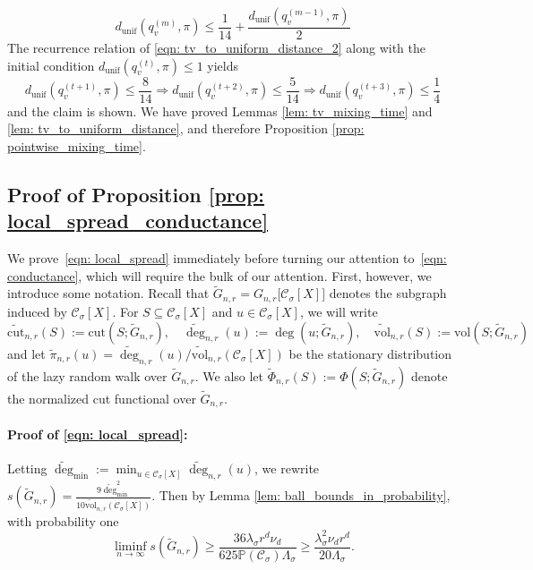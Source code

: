 \documentclass[11pt,twoside]{article}
\newcommand{\vol}{\mathrm{vol}}
\newcommand{\cut}{\mathrm{cut}}
\newcommand{\1}{\mathbf{1}}
\newcommand{\Xbf}{X}             %
\newcommand{\Pbb}{\mathbb{P}}
\newcommand{\Cset}{\mathcal{C}}
\newcommand{\Csig}{\Cset_{\sigma}}
\newcommand{\degminwt}{\widetilde{\deg}_{\min}}
\begin{document}
\begin{equation}
d_{\textrm{unif}}(q_v^{(m)}, \pi) \leq \frac{1}{14} + \frac{d_{\textrm{unif}}(q_v^{(m - 1)}, \pi)}{2} \label{eqn: tv_to_uniform_distance_2}
\end{equation}
The recurrence relation of \eqref{eqn: tv_to_uniform_distance_2} along with the initial condition $d_{\textrm{unif}}(q_v^{(t)}, \pi) \leq 1$ yields
\begin{equation*}
d_{\textrm{unif}}(q_v^{(t + 1)}, \pi) \leq \frac{8}{14} \Rightarrow d_{\textrm{unif}}(q_v^{(t + 2)}, \pi) \leq \frac{5}{14} \Rightarrow  d_{\textrm{unif}}(q_v^{(t + 3)}, \pi) \leq \frac{1}{4}
\end{equation*}
and the claim is shown. We have proved Lemmas \ref{lem: tv_mixing_time} and \ref{lem: tv_to_uniform_distance}, and therefore Proposition \ref{prop: pointwise_mixing_time}.

\subsection{Proof of Proposition \ref{prop: local_spread_conductance}}

We prove~\eqref{eqn: local_spread} immediately before turning our attention to~\eqref{eqn: conductance}, which will require the bulk of our attention. First, however, we introduce some notation. Recall that $\widetilde{G}_{n,r} = G_{n,r}\bigl[\Csig[\Xbf]\bigr]$ denotes the subgraph induced by $\Csig[\Xbf]$. For $S \subseteq \Csig[\Xbf]$ and $u \in \Csig[\Xbf]$, we will write
\begin{equation*}
\widetilde{\cut}_{n,r}(S) := \cut(S; \widetilde{G}_{n,r}), \quad \widetilde{\deg}_{n,r}(u) := \deg(u; \widetilde{G}_{n,r}), \quad 
\widetilde{\vol}_{n,r}(S) := \vol(S; \widetilde{G}_{n,r})
\end{equation*}
and let $\widetilde{\pi}_{n,r}(u) = \widetilde{\deg}_{n,r}(u)/\widetilde{\vol}_{n,r}(\Csig[\Xbf])$ be the stationary distribution of the lazy random walk over $\widetilde{G}_{n,r}$. We also let $\widetilde{\Phi}_{n,r}(S) := \Phi(S; \widetilde{G}_{n,r})$ denote the normalized cut functional over $\widetilde{G}_{n,r}$. 

\paragraph{Proof of \eqref{eqn: local_spread}:}

Letting $\degminwt := \min_{u \in \Csig[\Xbf]} \widetilde{\deg}_{n,r}(u)$, we rewrite $s(\widetilde{G}_{n,r}) = \frac{9 \degminwt^2}{10\widetilde{\vol}_{n,r}(\Csig[\Xbf])}$. Then by Lemma \ref{lem: ball_bounds_in_probability}, with probability one
\begin{equation*}
\liminf_{n \to \infty} s(\widetilde{G}_{n,r}) \geq \frac{36 \lambda_{\sigma} r^d \nu_d}{625 \Pbb(\Csig) \Lambda_{\sigma}} \geq \frac{\lambda_{\sigma}^2 \nu_d r^d}{20\Lambda_{\sigma}}.
\end{equation*}
\end{document}
